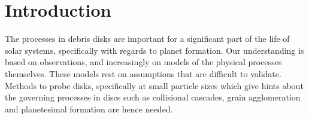 \documentclass{aa}
\begin{document}

   \maketitle
%

\section{Introduction}
\label{sec:introduction}








The processes in debris disks are important for a significant part of the life of solar systems, specifically with regards to planet formation. Our understanding is based on observations, and increasingly on models of the physical processes themselves. These models rest on assumptions that are difficult to validate. Methods to probe disks, specifically at small particle sizes which give hints about the governing processes in discs such as collisional cascades, grain agglomeration and planetesimal formation are hence needed.
\end{document}
